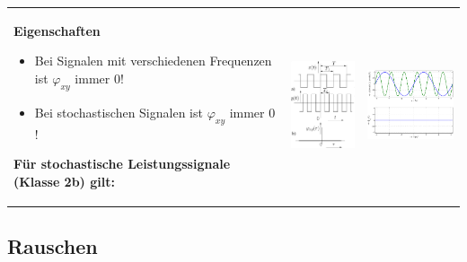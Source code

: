 		\begin{tabularx}{\textwidth}{llX}
		\parbox{10.5cm}{
			\textbf{Eigenschaften}
			\begin{itemize}
     			\item Bei Signalen mit verschiedenen Frequenzen ist $\varphi_{xy}$ immer $0$!
     			\item Bei stochastischen Signalen ist $\varphi_{xy}$ immer $0$!
   			\end{itemize}
   			
   			\textbf{Für stochastische Leistungssignale (Klasse 2b) gilt:} \\
   			\\
   		} 
   		&
   		\parbox{2.9cm}{
   			\includegraphics[width=2.9cm]{./bilder/kkf1.png}
   		} 
   		&
   		\parbox{3.9cm}{
   			\includegraphics[width=3.9cm]{./bilder/kkf2.png}
   		} 
   		\\
		\end{tabularx}
		
		
	\subsection{Rauschen  }
	
